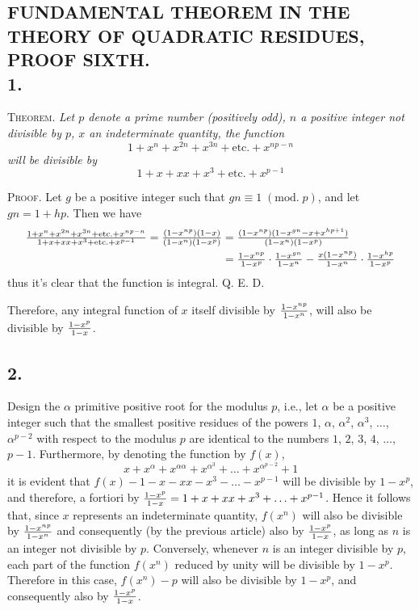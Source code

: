 \documentclass[twoside,12pt, showframe]{memoir}
\renewcommand{\pmod}[1]{\;(\textrm{mod.}\;#1)}
\let\oldfrac\frac
\def\frac#1#2{\mathchoice{\tfrac{#1}{#2}}{\oldfrac{#1}{#2}}{\genfrac{}{}{}{2}{#1}{#2\mathstrut}}{\genfrac{}{}{}{3}{#1}{#2\mathstrut}}}
\begin{document}
\subsection*{{\scriptsize FUNDAMENTAL THEOREM IN THE THEORY OF QUADRATIC RESIDUES, PROOF SIXTH.}\\
1.}
 
\textsc{Theorem.} \textit{Let \(p\) denote a prime number (positively odd), \(n\) a positive integer not divisible by \(p\), \(x\) an indeterminate quantity, the function}
\[1+x^{n}+x^{2 n}+x^{3 n}+\text{etc.}+x^{n p-n}\]
\textit{will be divisible by}
\[1+x+x x+x^{3}+\text{etc.}+x^{p-1}\]
 
\textsc{Proof.} Let \(g\) be a positive integer such that \(g n \equiv 1\pmod{p}\), and let \(g n=1+h p\). Then we have
\[\begin{aligned}
\frac{1+x^{n}+x^{2 n}+x^{3 n}+\text{etc.}+x^{n p-n}}{1+x+x x+x^{3}+\text{etc.}+x^{p-1}}=\frac{(1-x^{n p})(1-x)}{(1-x^{n})(1-x^{p})} & =\frac{(1-x^{n p})(1-x^{g n}-x+x^{h p+1})}{(1-x^{n})(1-x^{p})} \\
& =\frac{1-x^{n p}}{1-x^{p}} \cdot \frac{1-x^{g n}}{1-x^{n}}-\frac{x(1-x^{n p})}{1-x^{n}} \cdot \frac{1-x^{h p}}{1-x^{p}}
\end{aligned}\]
thus it's clear that the function is integral. Q. E. D.
 
Therefore, any integral function of \(x\) itself divisible by \(\frac{1-x^{n p}}{1-x^{n}}\), will also be divisible by \(\frac{1-x^{p}}{1-x}\).
%

\subsection*{2.}

Design the \(\alpha\) primitive positive root for the modulus \(p\), i.e., let \(\alpha\) be a positive integer such that the smallest positive residues of the powers \(1\), \(\alpha\), \(\alpha^2\), \(\alpha^{3}\), \(\ldots\), \(\alpha^{p-2}\) with respect to the modulus \(p\) are identical to the numbers \(1\), \(2\), \(3\), \(4\), \(\ldots\), \(p-1\). Furthermore, by denoting the function by \(f(x)\),
\[x+x^{\alpha}+x^{\alpha \alpha}+x^{\alpha^{3}}+\ldots+x^{\alpha^{p-2}}+1\]
it is evident that \(f(x)-1-x-x x-x^{3}-\ldots-x^{p-1}\) will be divisible by \(1-x^{p}\), and therefore, a fortiori by \(\frac{1-x^{p}}{1-x}=1+x+x x+x^{3}+\ldots+x^{p-1}\). Hence it follows that, since \(x\) represents an indeterminate quantity, \(f(x^{n})\) will also be divisible by \(\frac{1-x^{n p}}{1-x^{n}}\) and consequently (by the previous article) also by \(\frac{1-x^{p}}{1-x}\), as long as \(n\) is an integer not divisible by \(p\). Conversely, whenever \(n\) is an integer divisible by \(p\), each part of the function \(f(x^{n})\) reduced by unity will be divisible by \(1-x^{p}\). Therefore in this case, \(f(x^{n})-p\) will also be divisible by \(1-x^{p}\), and consequently also by \(\frac{1-x^{p}}{1-x}\).
%
\end{document}
